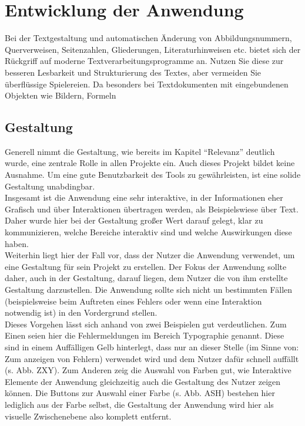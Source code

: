 \chapter{Entwicklung der Anwendung}
\thispagestyle{fancy}
Bei der Textgestaltung und automatischen Änderung von Abbildungsnummern, Querverweisen,
Seitenzahlen, Gliederungen, Literaturhinweisen etc. bietet sich der Rückgriff
auf moderne Textverarbeitungsprogramme an. Nutzen Sie diese zur besseren Lesbarkeit
und Strukturierung des Textes, aber vermeiden Sie überflüssige Spielereien. Da
besonders bei Textdokumenten mit eingebundenen Objekten wie Bildern, Formeln

\section{Gestaltung}
Generell nimmt die Gestaltung, wie bereits im Kapitel “Relevanz” deutlich wurde, eine zentrale Rolle in allen Projekte ein. Auch dieses Projekt bildet keine Ausnahme. Um eine gute Benutzbarkeit des Tools zu gewährleisten, ist eine solide Gestaltung unabdingbar. \\

Insgesamt ist die Anwendung eine sehr interaktive, in der Informationen eher Grafisch und über Interaktionen übertragen werden, als Beispielswiese über Text. Daher wurde hier bei der Gestaltung großer Wert darauf gelegt, klar zu kommunizieren, welche Bereiche interaktiv sind und welche Auswirkungen diese haben. \\
Weiterhin liegt hier der Fall vor, dass der Nutzer die Anwendung verwendet, um eine Gestaltung für sein Projekt zu erstellen. Der Fokus der Anwendung sollte daher, auch in der Gestaltung, darauf liegen, dem Nutzer die von ihm erstellte Gestaltung darzustellen. Die Anwendung sollte sich nicht un bestimmten Fällen (beispielsweise beim Auftreten eines Fehlers oder wenn eine Interaktion notwendig ist) in den Vordergrund stellen. \\

Dieses Vorgehen lässt sich anhand von zwei Beispielen gut verdeutlichen. Zum Einen seien hier die Fehlermeldungen im Bereich Typographie genannt. Diese sind in einem Auffälligen Gelb hinterlegt, dass nur an dieser Stelle (im Sinne von: Zum anzeigen von Fehlern) verwendet wird und dem Nutzer dafür schnell auffällt (s. Abb. ZXY).
Zum Anderen zeig die Auswahl von Farben gut, wie Interaktive Elemente der Anwendung gleichzeitig auch die Gestaltung des Nutzer zeigen können. Die Buttons zur Auswahl einer Farbe (s. Abb. ASH) bestehen hier lediglich aus der Farbe selbst, die Gestaltung der Anwendung wird hier als visuelle Zwischenebene also komplett entfernt. \\

